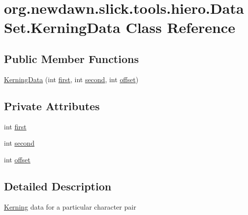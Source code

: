 \hypertarget{classorg_1_1newdawn_1_1slick_1_1tools_1_1hiero_1_1_data_set_1_1_kerning_data}{}\section{org.\+newdawn.\+slick.\+tools.\+hiero.\+Data\+Set.\+Kerning\+Data Class Reference}
\label{classorg_1_1newdawn_1_1slick_1_1tools_1_1hiero_1_1_data_set_1_1_kerning_data}
\subsection*{Public Member Functions}
\begin{DoxyCompactItemize}
\item 
\mbox{\hyperlink{classorg_1_1newdawn_1_1slick_1_1tools_1_1hiero_1_1_data_set_1_1_kerning_data_a82389d350aa716ed23d1fa5e93580296}{Kerning\+Data}} (int \mbox{\hyperlink{classorg_1_1newdawn_1_1slick_1_1tools_1_1hiero_1_1_data_set_1_1_kerning_data_a6667050cdee4361446e20de1f1292b2a}{first}}, int \mbox{\hyperlink{classorg_1_1newdawn_1_1slick_1_1tools_1_1hiero_1_1_data_set_1_1_kerning_data_a13d25b8bfb991e1743faec553e7752fc}{second}}, int \mbox{\hyperlink{classorg_1_1newdawn_1_1slick_1_1tools_1_1hiero_1_1_data_set_1_1_kerning_data_a38e775176b852319c15aa7a7ecdb2966}{offset}})
\end{DoxyCompactItemize}
\subsection*{Private Attributes}
\begin{DoxyCompactItemize}
\item 
int \mbox{\hyperlink{classorg_1_1newdawn_1_1slick_1_1tools_1_1hiero_1_1_data_set_1_1_kerning_data_a6667050cdee4361446e20de1f1292b2a}{first}}
\item 
int \mbox{\hyperlink{classorg_1_1newdawn_1_1slick_1_1tools_1_1hiero_1_1_data_set_1_1_kerning_data_a13d25b8bfb991e1743faec553e7752fc}{second}}
\item 
int \mbox{\hyperlink{classorg_1_1newdawn_1_1slick_1_1tools_1_1hiero_1_1_data_set_1_1_kerning_data_a38e775176b852319c15aa7a7ecdb2966}{offset}}
\end{DoxyCompactItemize}


\subsection{Detailed Description}
\mbox{\hyperlink{classorg_1_1newdawn_1_1slick_1_1tools_1_1hiero_1_1_kerning}{Kerning}} data for a particular character pair

